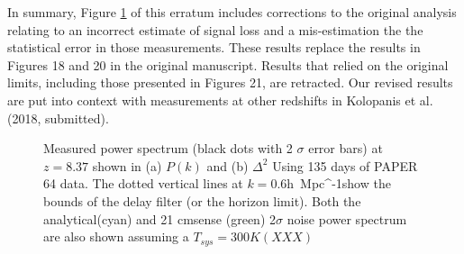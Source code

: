 \documentclass[onecolumn]{emulateapj} \shorttitle{}
\newcommand{\hMpci}{h\ {\rm Mpc}^{-1}}
\newcommand{\kolopaniscitet}{Kolopanis et al. (2018, submitted)}
\begin{document}
In summary, Figure \ref{fig:updated_pspec} of this erratum includes corrections to the original analysis relating to
an incorrect estimate of signal loss and a mis-estimation the the statistical error in those measurements.
These results replace the results in Figures 18 and 20 in the original manuscript.  Results that relied on
the original limits, including those presented in Figures 21, are retracted.
Our revised results are put into context with measurements at other redshifts in \kolopaniscitet.  

\begin{figure}%
    \centering
    \qquad
    \caption{Measured power spectrum (black dots with 2 $\sigma$ error bars) at $z=8.37$ shown in (a) $P(k)$ and (b) $\Delta^{2}$
             Using 135 days of PAPER 64 data. The dotted vertical lines at $k=0.6$\hMpci show the bounds of the delay filter (or the horizon limit).
             Both the analytical(cyan) and 21 cmsense (green) 2$\sigma$ noise power spectrum are also shown assuming a $T_{sys}=300K (XXX)$}%
    \label{fig:updated_pspec}%
\end{figure}

\clearpage
\nocite{*}


\end{document}
